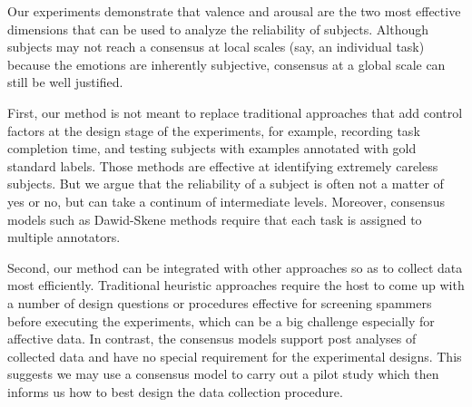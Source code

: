 \documentclass[10pt,journal,letterpaper,compsoc,twoside]{IEEEtran}
\begin{document}

{Our experiments demonstrate that valence and arousal are the two
most effective dimensions that can be used to analyze the reliability of subjects. 
Although subjects may not reach a consensus at local scales (say, an individual task) because the emotions are inherently subjective,
consensus at a global scale can still be well justified.} \\



{
First, our method is not meant to replace traditional approaches that add control factors at the design stage
of the experiments, for example, recording task completion time, and testing subjects with examples annotated with gold standard labels. Those methods 
are effective at identifying extremely careless subjects. But we argue that 
the reliability of a subject is often not a matter of yes or no, but can take a continum of intermediate levels. Moreover, consensus models such as Dawid-Skene methods 
require that each task is assigned to multiple annotators.}

{
Second, our method can be integrated with other approaches so as to collect data most efficiently.   
Traditional heuristic approaches require the host to come up with a number of design questions or procedures effective for screening spammers before executing the experiments, which can be a big challenge especially for affective data.
In contrast, the consensus models 
support post analyses of collected data and have no special requirement for the experimental designs. This suggests we may use a consensus model to carry out a pilot study which then informs us how to best design the data collection procedure.}
\end{document}
